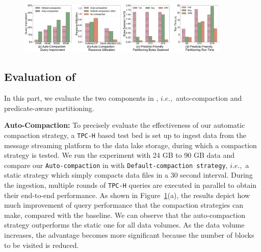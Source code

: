 \begin{figure}
	\centering
	\includegraphics[width=0.9\textwidth]{figures/LakeBrain}
	\vspace{-1em}
	\caption{}
	\label{fig:lakebrain}
	\vspace{-1em}
\end{figure}



\subsection{Evaluation of \brain}

In this part, we evaluate the two components in \brain, $i.e.,$ auto-compaction and predicate-aware partitioning.

 
\noindent \textbf{Auto-Compaction:} To precisely evaluate the effectiveness of our automatic compaction strategy, a \texttt{TPC-H} based test bed is set up to ingest data from the message streaming platform to the data lake storage, during which a compaction strategy is tested.
 We run the experiment with 24 GB to 90 GB data and compare our \texttt{Auto-compaction} in \sys with \texttt{Default-compaction strategy}, $i.e.,$ a static strategy which simply compacts data files in a 30 second interval. 
During the ingestion, multiple rounds of \texttt{TPC-H} queries are executed in parallel  to obtain their end-to-end performance. As shown in Figure~\ref{fig:lakebrain}(a), the results depict how much improvement of  query performance that the compaction strategies can make, compared with the baseline.
 We can observe that the auto-compaction strategy outperforms the static one for all data volumes. As the data volume increases, the advantage becomes more significant because the number of blocks to be visited is reduced.




